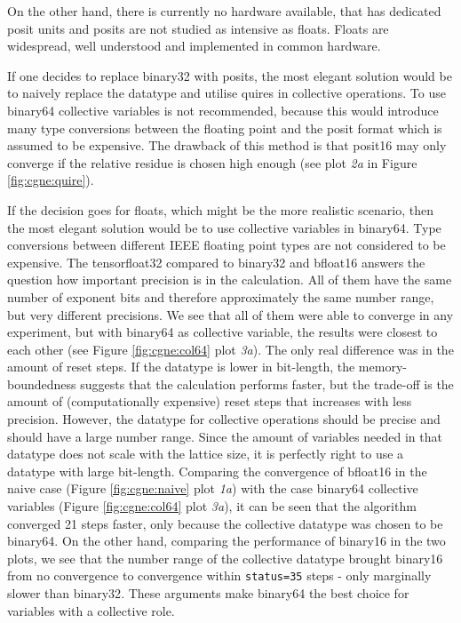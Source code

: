 \documentclass{article}
\theoremstyle{plain} %
\theoremstyle{convention} %
\theoremstyle{remark} %
\def\code#1{\texttt{#1}}
\numberwithin{equation}{section}
\begin{document}
On the other hand, there is currently no hardware available, that has dedicated posit units and posits are not studied as intensive as floats. Floats are widespread, well understood and implemented in common hardware.

If one decides to replace \gls{binary32} with posits, the most elegant solution would be to naively replace the datatype and utilise \glspl{quire} in collective operations. To use \gls{binary64} collective variables is not recommended, because this would introduce many type conversions between the floating point and the posit format which is assumed to be expensive. The drawback of this method is that \gls{posit16} may only converge if the relative residue is chosen high enough (see plot \textit{2a} in Figure \ref{fig:cgne:quire}).

If the decision goes for floats, which might be the more realistic scenario, then the most elegant solution would be to use collective variables in \gls{binary64}. Type conversions between different IEEE floating point types are not considered to be expensive. The \gls{tensorfloat32} compared to \gls{binary32} and \gls{bfloat16} answers the question how important precision is in the calculation. All of them have the same number of exponent bits and therefore approximately the same number range, but very different precisions. We see that all of them were able to converge in any experiment, but with \gls{binary64} as collective variable, the results were closest to each other (see Figure \ref{fig:cgne:col64} plot \textit{3a}). The only real difference was in the amount of reset steps. If the datatype is lower in bit-length, the memory-boundedness suggests that the calculation performs faster, but the trade-off is the amount of (computationally expensive) reset steps that increases with less precision. However, the datatype for collective operations should be precise and should have a large number range. Since the amount of variables needed in that datatype does not scale with the lattice size, it is perfectly right to use a datatype with large bit-length. Comparing the convergence of \gls{bfloat16} in the naive case (Figure \ref{fig:cgne:naive} plot \textit{1a}) with the case \gls{binary64} collective variables (Figure \ref{fig:cgne:col64} plot \textit{3a}), it can be seen that the algorithm converged \num{21} steps faster, only because the collective datatype was chosen to be \gls{binary64}. On the other hand, comparing the performance of \gls{binary16} in the two plots, we see that the number range of the collective datatype brought \gls{binary16} from no convergence to convergence within \code{status=35} steps - only marginally slower than \gls{binary32}. These arguments make \gls{binary64} the best choice for variables with a collective role.
\end{document}
